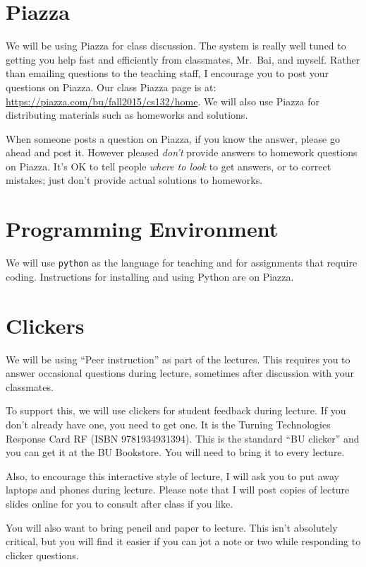 \documentclass[11pt]{article}
\begin{document}
\section*{Piazza}

We will be using Piazza for class discussion. The system is really well
tuned to getting you help fast and efficiently from classmates, Mr.\ Bai,
and myself. Rather than emailing questions to the teaching staff,
I encourage you to post your questions on Piazza.   Our class Piazza
page  is at: \url{https://piazza.com/bu/fall2015/cs132/home}. 
We will also use Piazza for distributing materials
such as homeworks and solutions.

When someone posts a question on Piazza, if you know the answer, please
go ahead and post it.   However pleased \emph{don't} provide answers to homework
questions on Piazza.   It's OK to tell people \emph{where to look} to
get answers, or to correct mistakes;  just don't provide actual solutions
to homeworks.

\section*{Programming Environment}

We will use \texttt{python} as the language for teaching and for
assignments that require coding.    Instructions for installing and
using Python are on Piazza.

\section*{Clickers}

We will be using ``Peer instruction'' as part of the lectures.  This
requires you to answer occasional questions during lecture, sometimes
after discussion with your classmates.   

To support this, we will use clickers for student feedback during lecture.  If you
don't already have one, you need to get one.  It is the Turning
Technologies Response Card RF (ISBN 9781934931394).  This is the
standard ``BU clicker'' and you can get it at
the BU Bookstore.   You will need to bring it to every lecture.

Also, to encourage this interactive style of lecture, I will ask you to
put away laptops and phones during lecture.    Please note that I will
post copies of lecture slides online for you to consult after class if
you like.

You will also want to bring pencil and paper to lecture.   This isn't
absolutely critical, but you will find it easier if you can jot a note
or two while responding to clicker questions.
\end{document}

